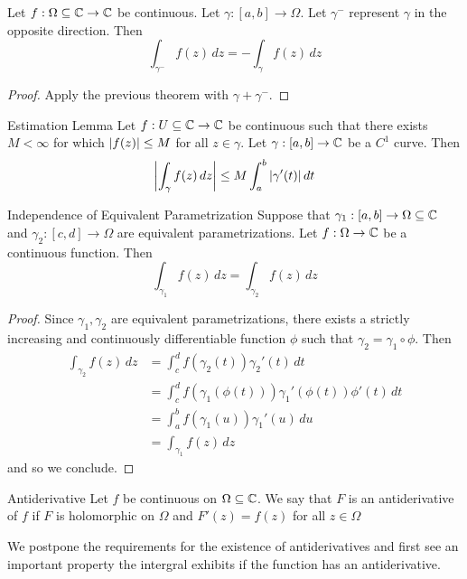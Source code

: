 \documentclass[a4paper]{article}
\begin{document}
\begin{prp}{}{} Let $f:\Omega\subseteq\mathbb{C}\to\mathbb{C}$ be continuous. Let $\gamma:[a,b]\to\Omega$. Let $\gamma^-$ represent $\gamma$ in the opposite direction. Then $$\int_{\gamma^-}f(z)\,dz=-\int_\gamma f(z)\,dz$$ \tcbline
\begin{proof} Apply the previous theorem with $\gamma+\gamma^-$. 
\end{proof}
\end{prp}

\begin{lmm}{Estimation Lemma}{} Let $f:U\subseteq\mathbb{C}\to\mathbb{C}$ be continuous such that there exists $M<\infty$ for which $\abs{f(z)}\leq M$ for all $z\in\gamma$. Let $\gamma:[a,b]\to\mathbb{C}$ be a $C^1$ curve. Then $$\abs{\int_{\gamma}f(z)\,dz}\leq M\int_a^b\abs{\gamma'(t)}\,dt$$
\end{lmm}

\begin{prp}{Independence of Equivalent Parametrization}{} Suppose that $\gamma_1:[a,b]\to\Omega\subseteq\mathbb{C}$ and $\gamma_2:[c,d]\to\Omega$ are equivalent parametrizations. Let $f:\Omega\to\mathbb{C}$ be a continuous function. Then $$\int_{\gamma_1}f(z)\,dz=\int_{\gamma_2}f(z)\,dz$$ \tcbline
\begin{proof} Since $\gamma_1,\gamma_2$ are equivalent parametrizations, there exists a strictly increasing and continuously differentiable function $\phi$ such that $\gamma_2=\gamma_1\circ\phi$. Then
\begin{align*}
\int_{\gamma_2}f(z)\,dz&=\int_c^df(\gamma_2(t))\gamma_2'(t)\,dt\\
&=\int_c^df(\gamma_1(\phi(t)))\gamma_1'(\phi(t))\phi'(t)\,dt\tag{Let $u=\phi(t)$}\\
&=\int_a^bf(\gamma_1(u))\gamma_1'(u)\,du\\
&=\int_{\gamma_1}f(z)\,dz
\end{align*}
and so we conclude. 
\end{proof}
\end{prp}

\begin{defn}{Antiderivative}{} Let $f$ be continuous on $\Omega\subseteq\mathbb{C}$. We say that $F$ is an antiderivative of $f$ if $F$ is holomorphic on $\Omega$ and $F'(z)=f(z)$ for all $z\in\Omega$
\end{defn}

We postpone the requirements for the existence of antiderivatives and first see an important property the intergral exhibits if the function has an antiderivative. 
\end{document}
